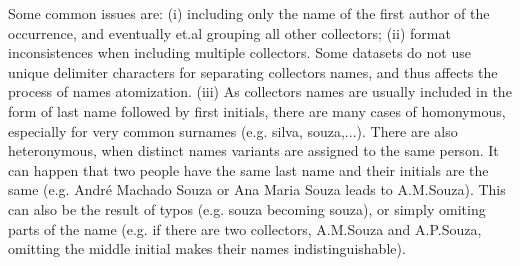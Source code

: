 



Some common issues are: (i) including only the name of the first author of the occurrence, and eventually et.al grouping all other collectors;
(ii) format inconsistences when including multiple collectors. Some datasets do not use unique delimiter characters for separating collectors names, and thus affects the process of names atomization.
(iii) As collectors names are usually included in the form of last name followed by first initials, there are many cases of homonymous, especially for very common surnames (e.g. silva, souza,...).
There are also heteronymous, when distinct names variants are assigned to the same person. It can happen that two people have the same last name and their initials are the same (e.g. André Machado Souza or Ana Maria Souza leads to A.M.Souza).
This can also be the result of typos (e.g. souza becoming souza), or simply omiting parts of the name (e.g. if there are two collectors, A.M.Souza and A.P.Souza, omitting the middle initial makes their names indistinguishable).

